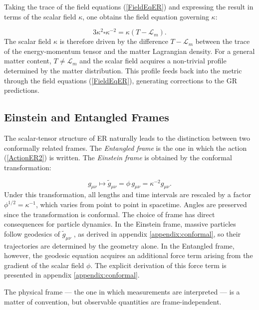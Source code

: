 \documentclass[floats,floatfix,aps, preprintnumbers,nofootinbib]{revtex4-2}
\newcommand{\mcal}{\mathcal}
\begin{document}
Taking the trace of the field equations (\ref{FieldEqER}) and expressing the result in terms of the scalar field $\kappa$, one obtains the field equation governing $\kappa$:

\begin{equation}\label{KappaEOM}
    3\kappa^2\square\kappa^{-2} = \kappa(T - \mcal L_m).
\end{equation}
The scalar field $\kappa$ is therefore driven by the difference $T - \mcal L_m$ between the trace of the energy-momentum tensor and the matter Lagrangian density. For a general matter content, $T \neq \mcal L_m$ and the scalar field acquires a non-trivial profile determined by the matter distribution. This profile feeds back into the metric through the field equations (\ref{FieldEqER}), generating corrections to the GR predictions.

\subsection{Einstein and Entangled Frames}

The scalar-tensor structure of ER naturally leads to the distinction between two conformally related frames. The \emph{Entangled frame} is the one in which the action (\ref{ActionER2}) is written. The \emph{Einstein frame} is obtained by the conformal transformation:

\begin{equation}\label{ConfTransform}
    g_{\mu\nu} \mapsto \tilde{g}_{\mu\nu} = \phi\, g_{\mu\nu} = \kappa^{-2} g_{\mu\nu}.
\end{equation}
Under this transformation, all lengths and time intervals are rescaled by a factor $\phi^{1/2} = \kappa^{-1}$, which varies from point to point in spacetime. Angles are preserved since the transformation is conformal. The choice of frame has direct consequences for particle dynamics. In the Einstein frame, massive particles follow geodesics of $\tilde{g}_{\mu\nu}$ \cite{Chehab_2026}, as derived in appendix \ref{appendix:conformal}, so their trajectories are determined by the geometry alone. In the Entangled frame, however, the geodesic equation acquires an additional force term arising from the gradient of the scalar field $\phi$. The explicit derivation of this force term is presented in appendix \ref{appendix:conformal}.

The physical frame — the one in which measurements are interpreted — is a matter of convention, but observable quantities are frame-independent.
\end{document}
